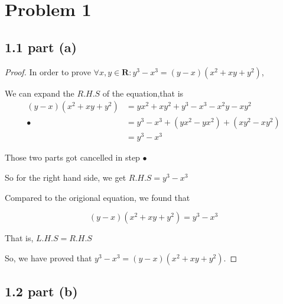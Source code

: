 \documentclass[12pt]{article}
\begin{document}
\section*{Problem 1}

\subsection*{1.1 part (a)}

\begin{proof}
    
    \vspace*{0.3cm}
    In order to prove $ \forall x,y \in \mathbf{R}: 
    y^3 - x^3 = (y-x)(x^2 + xy + y^2)$,

    \vspace*{0.5cm}
    \hspace*{1.2cm}
    We can expand the $R.H.S$ of the equation,that is
    \begin{align*}
        (y-x)(x^2+xy+y^2) &= yx^2+xy^2+y^3-x^3-x^2y-xy^2 \\
        \bullet & = y^3-x^3+(yx^2-yx^2)+(xy^2-xy^2) \\
        & = y^3-x^3
    \end{align*}

    \hspace*{1.2cm}Those two parts got cancelled in step $\bullet$

    \vspace*{0.3cm}
    \hspace*{1.2cm}
    So for the right hand side, we get $R.H.S = y^3-x^3$
    
    \vspace*{0.3cm}
    \hspace*{1.2cm}
    Compared to the origional equation, we found that

    \[(y-x)(x^2+xy+y^2) = y^3-x^3\]

    \vspace*{0.3cm}
    \hspace*{1.2cm}
    That is, $L.H.S = R.H.S$

    \vspace*{0.3cm}
    \hspace*{1.2cm}
    So, we have proved that $y^3 - x^3 = (y-x)(x^2 + xy + y^2)$.
        
    

\end{proof}

\subsection*{1.2 part (b)}
\end{document}
